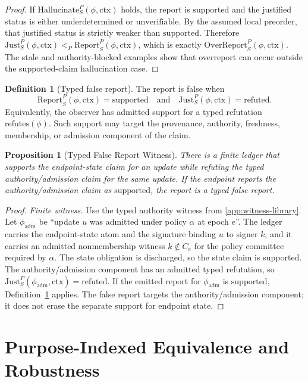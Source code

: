 \documentclass[11pt,twoside]{article}
\newtheorem{proposition}[theorem]{Proposition}
\theoremstyle{definition}
\newtheorem{definition}[theorem]{Definition}
\newcommand{\Just}{\mathrm{Just}}
\newcommand{\Report}{\mathrm{Report}}
\newcommand{\Refutes}{\mathrm{refutes}}
\newcommand{\OverReport}{\mathrm{OverReport}}
\newcommand{\Hallucinate}{\mathrm{Hallucinate}}
\newcommand{\ctx}{\mathrm{ctx}}
\newcommand{\supported}{\mathrm{supported}}
\newcommand{\refuted}{\mathrm{refuted}}
\newcommand{\underdetermined}{\mathrm{underdetermined}}
\newcommand{\unverifiable}{\mathrm{unverifiable}}
\begin{document}
\begin{proof}
If $\Hallucinate_S^P(\phi,\ctx)$ holds, the report is $\supported$ and the
justified status is either $\underdetermined$ or $\unverifiable$. By the
assumed local preorder, that justified status is strictly weaker than
$\supported$. Therefore
$\Just_S^P(\phi,\ctx)<_P\Report_S^P(\phi,\ctx)$, which is exactly
$\OverReport_S^P(\phi,\ctx)$. The stale and authority-blocked examples show
that overreport can occur outside the supported-claim hallucination case.
\end{proof}

\begin{definition}[Typed false report]
\label{def:typed-false-report}
The report is false when
\[
  \Report_S^P(\phi,\ctx)=\supported
  \quad\text{and}\quad
  \Just_S^P(\phi,\ctx)=\refuted.
\]
Equivalently, the observer has admitted support for a typed refutation
$\Refutes(\phi)$. Such support may target the provenance, authority, freshness,
membership, or admission component of the claim.
\end{definition}

\begin{proposition}[Typed False Report Witness]
\label{prop:typed-false-report}
There is a finite ledger that supports the endpoint-state claim for an update
while refuting the typed authority/admission claim for the same update. If the
endpoint reports the authority/admission claim as $\supported$, the report is a
typed false report.
\end{proposition}

\begin{proof}
\textit{Finite witness.}
Use the typed authority witness from \cref{app:witness-library}. Let
$\phi_{\mathrm{adm}}$ be \enquote{update $u$ was admitted under policy $\alpha$
at epoch $e$}. The ledger carries the endpoint-state atom and the signature
binding $u$ to signer $k$, and it carries an admitted nonmembership witness
$k\notin C_e$ for the policy committee required by $\alpha$. The state
obligation is discharged, so the state claim is supported. The
authority/admission component has an admitted typed refutation, so
$\Just_S^P(\phi_{\mathrm{adm}},\ctx)=\refuted$. If the emitted report for
$\phi_{\mathrm{adm}}$ is $\supported$, Definition~\ref{def:typed-false-report}
applies. The false report targets the authority/admission component; it does
not erase the separate support for endpoint state.
\end{proof}

\section{Purpose-Indexed Equivalence and Robustness}
\label{sec:robustness}
\end{document}

